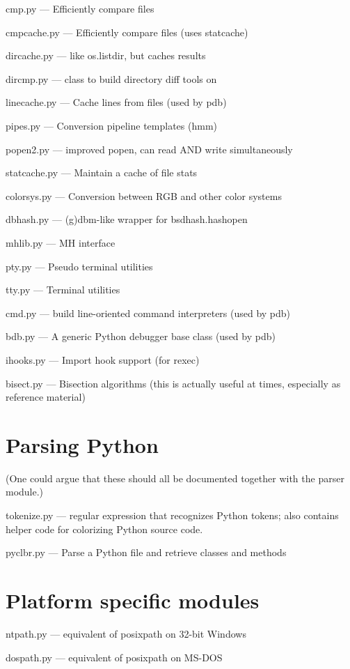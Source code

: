 cmp.py --- Efficiently compare files

cmpcache.py --- Efficiently compare files (uses statcache)

dircache.py --- like os.listdir, but caches results

dircmp.py --- class to build directory diff tools on

linecache.py --- Cache lines from files (used by pdb)

pipes.py --- Conversion pipeline templates (hmm)

popen2.py --- improved popen, can read AND write simultaneously

statcache.py --- Maintain a cache of file stats

colorsys.py --- Conversion between RGB and other color systems

dbhash.py --- (g)dbm-like wrapper for bsdhash.hashopen

mhlib.py --- MH interface

pty.py --- Pseudo terminal utilities

tty.py --- Terminal utilities

cmd.py --- build line-oriented command interpreters (used by pdb)

bdb.py --- A generic Python debugger base class (used by pdb)

ihooks.py --- Import hook support (for rexec)

bisect.py --- Bisection algorithms (this is actually useful at times,
especially as reference material)


\section{Parsing Python}

(One could argue that these should all be documented together with the
parser module.)

tokenize.py --- regular expression that recognizes Python tokens; also
contains helper code for colorizing Python source code.

pyclbr.py --- Parse a Python file and retrieve classes and methods


\section{Platform specific modules}

ntpath.py --- equivalent of posixpath on 32-bit Windows

dospath.py --- equivalent of posixpath on MS-DOS


